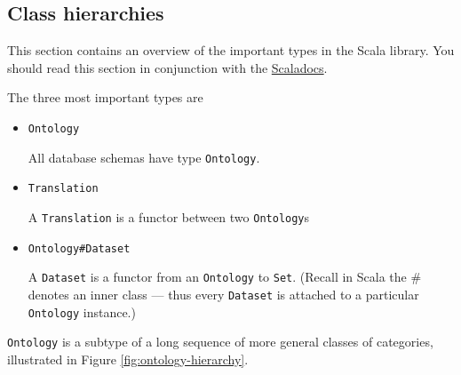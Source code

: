 \documentclass{amsart}
\newcommand{\type}[1]{{\tt #1}}
\begin{document}
\subsection{Class hierarchies}
This section contains an overview of the important types in the Scala library. You should read this section in conjunction with the \href{}{Scaladocs}.

The three most important types are
\begin{itemize}
\item {\color{gray}\type{net.metaphor.api.}}\type{Ontology}

All database schemas have type \type{Ontology}. 

\item {\color{gray}\type{net.metaphor.api.}}\type{Translation}

A \type{Translation} is a functor between two \type{Ontology}s

\item {\color{gray}\type{net.metaphor.api.}}\type{Ontology\#Dataset}

A \type{Dataset} is a functor from an \type{Ontology} to \type{Set}. 
(Recall in Scala the \# denotes an inner class --- thus every \type{Dataset} is attached to a particular \type{Ontology} instance.) 
\end{itemize}

\type{Ontology} is a subtype of a long sequence of more general classes of categories, illustrated in Figure \ref{fig:ontology-hierarchy}.

\end{document}
